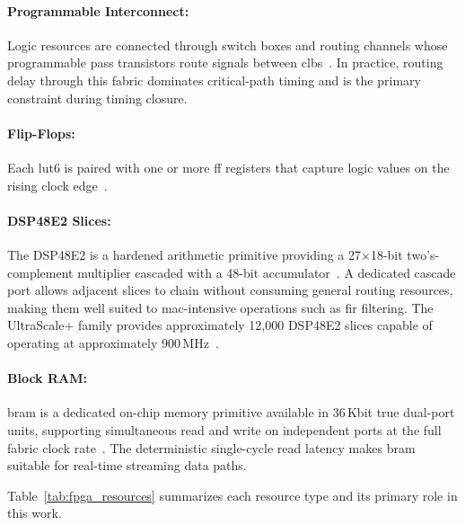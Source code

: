\paragraph{Programmable Interconnect:}
Logic resources are connected through switch boxes and routing channels
whose programmable pass transistors route signals between
\acp{clb}~\cite{AMD_UG574}.
In practice, routing delay through this fabric dominates critical-path
timing and is the primary constraint during timing closure.

\paragraph{Flip-Flops:}
Each \ac{lut6} is paired with one or more \ac{ff} registers that capture
logic values on the rising clock edge~\cite{AMD_UG574}.

\paragraph{DSP48E2 Slices:}
The DSP48E2 is a hardened arithmetic primitive providing a
27$\times$18-bit two's-complement multiplier cascaded with a 48-bit
accumulator~\cite{AMD_UG579}.
A dedicated cascade port allows adjacent slices to chain without
consuming general routing resources, making them well suited to
\ac{mac}-intensive operations such as \ac{fir} filtering.
The UltraScale+ family provides approximately 12{,}000 DSP48E2
slices capable of operating at approximately 900\,MHz~\cite{Boppana2015}.

\paragraph{Block RAM:}
\ac{bram} is a dedicated on-chip memory primitive available in 36\,Kbit
true dual-port units, supporting simultaneous read and write on
independent ports at the full fabric clock rate~\cite{AMD_UG574}.
The deterministic single-cycle read latency makes \ac{bram} suitable
for real-time streaming data paths.

Table~\ref{tab:fpga_resources} summarizes each resource type and its
primary role in this work.

